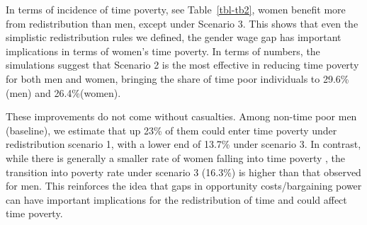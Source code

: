 \documentclass[
  11pt,
]{article}
\begin{document}
\begin{table}

\caption{\label{tbl-tb2}Time Poverty and Transition Rates}


\end{table}%

In terms of incidence of time poverty, see Table~\ref{tbl-tb2}, women
benefit more from redistribution than men, except under Scenario 3. This
shows that even the simplistic redistribution rules we defined, the
gender wage gap has important implications in terms of women's time
poverty. In terms of numbers, the simulations suggest that Scenario 2 is
the most effective in reducing time poverty for both men and women,
bringing the share of time poor individuals to 29.6\% (men) and
26.4\%(women).

These improvements do not come without casualties. Among non-time poor
men (baseline), we estimate that up 23\% of them could enter time
poverty under redistribution scenario 1, with a lower end of 13.7\%
under scenario 3. In contrast, while there is generally a smaller rate
of women falling into time poverty , the transition into poverty rate
under scenario 3 (16.3\%) is higher than that observed for men. This
reinforces the idea that gaps in opportunity costs/bargaining power can
have important implications for the redistribution of time and could
affect time poverty.
\end{document}

